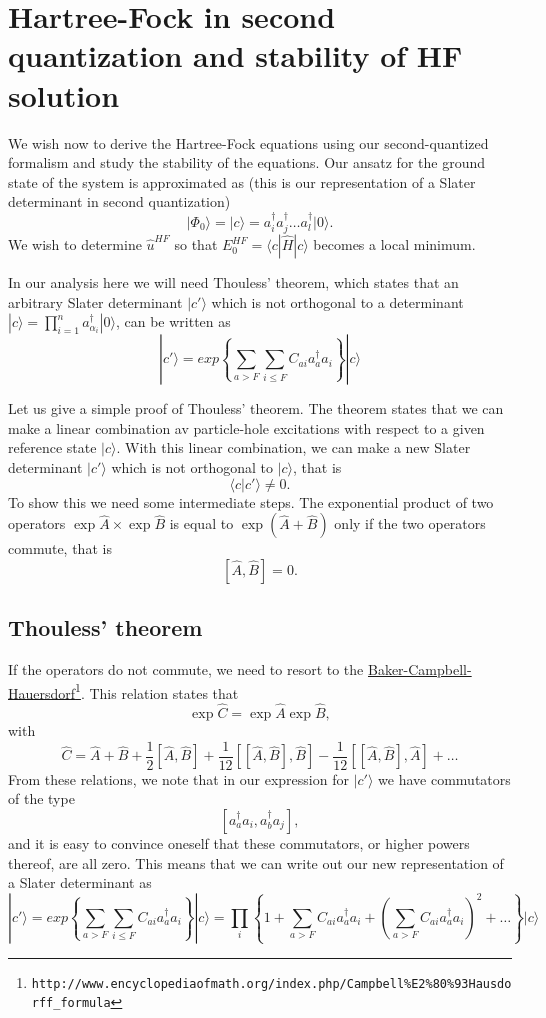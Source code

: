 \documentclass[graybox,sectrefs,envcountresetchap,open=right]{svmonodo}
\begin{document}
\section{Hartree-Fock in second quantization and stability of HF solution}

We wish now to derive the Hartree-Fock equations using our second-quantized formalism and study the stability of the equations. 
Our ansatz for the ground state of the system is approximated as (this is our representation of a Slater determinant in second quantization)
\[   
|\Phi_0\rangle = |c\rangle = a^{\dagger}_i a^{\dagger}_j \dots a^{\dagger}_l|0\rangle.
\]
We wish to determine $\hat{u}^{HF}$ so that 
$E_0^{HF}= \langle c|\hat{H}| c\rangle$ becomes a local minimum. 

In our analysis here we will need Thouless' theorem, which states that
an arbitrary Slater determinant $|c'\rangle$ which is not orthogonal to a determinant
$| c\rangle ={\displaystyle\prod_{i=1}^{n}}
a_{\alpha_{i}}^{\dagger}|0\rangle$, can be written as
\[
|c'\rangle=exp\left\{\sum_{a>F}\sum_{i\le F}C_{ai}a_{a}^{\dagger}a_{i}\right\}| c\rangle 
\]





Let us give a simple proof of Thouless' theorem. The theorem states that we can make a linear combination av particle-hole excitations  with respect to a given reference state $\vert c\rangle$. With this linear combination, we can make a new Slater determinant $\vert c'\rangle $ which is not orthogonal to 
$\vert c\rangle$, that is
\[
\langle c|c'\rangle \ne 0.
\] 
To show this we need some intermediate steps. The exponential product of two operators  $\exp{\hat{A}}\times\exp{\hat{B}}$ is equal to $\exp{(\hat{A}+\hat{B})}$ only if the two operators commute, that is
\[
[\hat{A},\hat{B}] = 0.
\]






\subsection{Thouless' theorem}


If the operators do not commute, we need to resort to the \href{{http://www.encyclopediaofmath.org/index.php/Campbell%
\[
\exp{\hat{C}}=\exp{\hat{A}}\exp{\hat{B}},
\]
with 
\[
\hat{C}=\hat{A}+\hat{B}+\frac{1}{2}[\hat{A},\hat{B}]+\frac{1}{12}[[\hat{A},\hat{B}],\hat{B}]-\frac{1}{12}[[\hat{A},\hat{B}],\hat{A}]+\dots
\]
From these relations, we note that 
in our expression  for $|c'\rangle$ we have commutators of the type
\[
[a_{a}^{\dagger}a_{i},a_{b}^{\dagger}a_{j}],
\]
and it is easy to convince oneself that these commutators, or higher powers thereof, are all zero. This means that we can write out our new representation of a Slater determinant as
\[
|c'\rangle=exp\left\{\sum_{a>F}\sum_{i\le F}C_{ai}a_{a}^{\dagger}a_{i}\right\}| c\rangle=\prod_{i}\left\{1+\sum_{a>F}C_{ai}a_{a}^{\dagger}a_{i}+\left(\sum_{a>F}C_{ai}a_{a}^{\dagger}a_{i}\right)^2+\dots\right\}| c\rangle
\]
\end{document}
